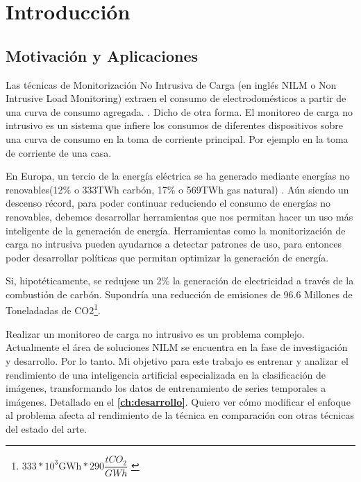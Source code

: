 
\chapter{Introducción}
\label{ch:intro}

\section{Motivación y Aplicaciones}
\label{sec:motivacionyaplicaciones}

Las técnicas de Monitorización No Intrusiva de Carga (en inglés NILM o Non Intrusive Load Monitoring) extraen el consumo de electrodomésticos a partir de una curva de consumo agregada. \autocite[1]{NILMreview2017}. Dicho de otra forma. El monitoreo de carga no intrusivo es un sistema que infiere los consumos de diferentes dispositivos sobre una curva de consumo en la toma de corriente principal. Por ejemplo en la toma de corriente de una casa.

En Europa, un tercio de la energía eléctrica se ha generado mediante energías no renovables(12\% o 333TWh carbón, 17\% o 569TWh gas natural)\autocite{energyeurope} \autocite{ember2024european}. Aún siendo un descenso récord, para poder continuar reduciendo el consumo de energías no renovables, debemos desarrollar herramientas que nos permitan hacer un uso más inteligente de la generación de energía. Herramientas como la monitorización de carga no intrusiva pueden ayudarnos a detectar patrones de uso\autocite[11]{nilmstateoftheart}, para entonces poder desarrollar políticas que permitan optimizar la generación de energía. 

Si, hipotéticamente, se redujese un 2\% la generación de electricidad a través de la combustión de carbón. Supondría una reducción de emisiones de 96.6 Millones de Toneladadas de CO2\footnote{$333*10^3\text{GWh}*290\dfrac{tCO_{2}}{GWh}$ \autocite{postcarbonelectricidad}}.

Realizar un monitoreo de carga no intrusivo es un problema complejo. Actualmente el área de soluciones NILM se encuentra en la fase de investigación y desarrollo. Por lo tanto. Mi objetivo para este trabajo es entrenar y analizar el rendimiento de una inteligencia artificial especializada en la clasificación de imágenes, transformando los datos de entrenamiento de series temporales a imágenes. Detallado en el \textbf{\autoref{ch:desarrollo}}. Quiero ver cómo modificar el enfoque al problema afecta al rendimiento de la técnica en comparación con otras técnicas del estado del arte. 

